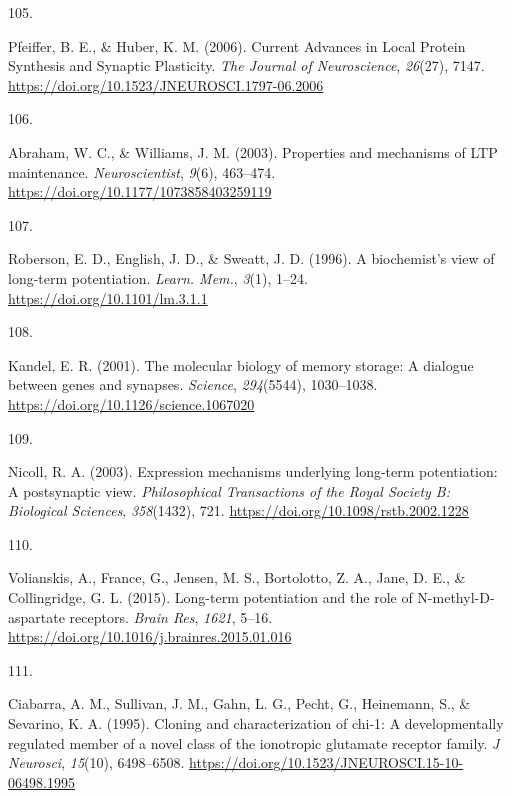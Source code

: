 \documentclass[
  11pt,
  letterpaper,
]{scrreprt}
\newlength{\cslhangindent}
\newlength{\csllabelwidth}
\newenvironment{CSLReferences}[2] %
 {\begin{list}{}{%
  \setlength{\itemindent}{0pt}
  \setlength{\leftmargin}{0pt}
  \setlength{\parsep}{0pt}
  \ifodd #1
   \setlength{\leftmargin}{\cslhangindent}
   \setlength{\itemindent}{-1\cslhangindent}
  \fi
  \setlength{\itemsep}{#2\baselineskip}}}
 {\end{list}}
\newcommand{\CSLLeftMargin}[1]{\parbox[t]{\csllabelwidth}{\strut#1\strut}}
\newcommand{\CSLRightInline}[1]{\parbox[t]{\linewidth - \csllabelwidth}{\strut#1\strut}}
\begin{document}
\begin{CSLReferences}{0}{0}
\CSLLeftMargin{105. }%
\CSLRightInline{Pfeiffer, B. E., \& Huber, K. M. (2006). Current
{Advances} in {Local Protein Synthesis} and {Synaptic Plasticity}.
\emph{The Journal of Neuroscience}, \emph{26}(27), 7147.
\url{https://doi.org/10.1523/JNEUROSCI.1797-06.2006}}

\CSLLeftMargin{106. }%
\CSLRightInline{Abraham, W. C., \& Williams, J. M. (2003). Properties
and mechanisms of {LTP} maintenance. \emph{Neuroscientist}, \emph{9}(6),
463--474. \url{https://doi.org/10.1177/1073858403259119}}

\CSLLeftMargin{107. }%
\CSLRightInline{Roberson, E. D., English, J. D., \& Sweatt, J. D.
(1996). A biochemist's view of long-term potentiation. \emph{Learn.
Mem.}, \emph{3}(1), 1--24. \url{https://doi.org/10.1101/lm.3.1.1}}

\CSLLeftMargin{108. }%
\CSLRightInline{Kandel, E. R. (2001). The molecular biology of memory
storage: A dialogue between genes and synapses. \emph{Science},
\emph{294}(5544), 1030--1038.
\url{https://doi.org/10.1126/science.1067020}}

\CSLLeftMargin{109. }%
\CSLRightInline{Nicoll, R. A. (2003). Expression mechanisms underlying
long-term potentiation: A postsynaptic view. \emph{Philosophical
Transactions of the Royal Society B: Biological Sciences},
\emph{358}(1432), 721. \url{https://doi.org/10.1098/rstb.2002.1228}}

\CSLLeftMargin{110. }%
\CSLRightInline{Volianskis, A., France, G., Jensen, M. S., Bortolotto,
Z. A., Jane, D. E., \& Collingridge, G. L. (2015). Long-term
potentiation and the role of {N-methyl-D-aspartate} receptors.
\emph{Brain Res}, \emph{1621}, 5--16.
\url{https://doi.org/10.1016/j.brainres.2015.01.016}}

\CSLLeftMargin{111. }%
\CSLRightInline{Ciabarra, A. M., Sullivan, J. M., Gahn, L. G., Pecht,
G., Heinemann, S., \& Sevarino, K. A. (1995). Cloning and
characterization of chi-1: A developmentally regulated member of a novel
class of the ionotropic glutamate receptor family. \emph{J Neurosci},
\emph{15}(10), 6498--6508.
\url{https://doi.org/10.1523/JNEUROSCI.15-10-06498.1995}}


\end{CSLReferences}
\end{document}
